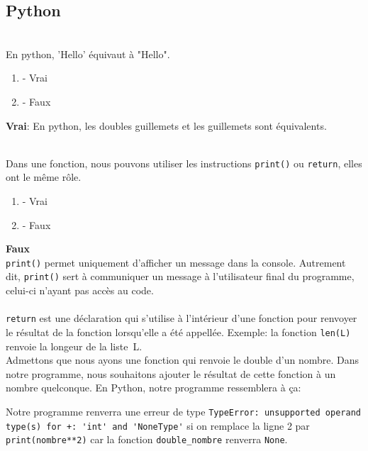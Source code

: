 \subsection{Python}

\begin{Exercice}[2 minutes]\\
En python, 'Hello' équivaut à "Hello". 

\begin{enumerate}[label=\Alph*]
    \item - Vrai
    \item - Faux
\end{enumerate}
\begin{solution}
    \textbf{Vrai}: En python, les doubles guillemets et les guillemets sont équivalents. 
\end{solution}
\end{Exercice}


\begin{Exercice}[2 minutes]\\
Dans une fonction, nous pouvons utiliser les instructions \lstinline{print()} ou \lstinline{return}, elles ont le même rôle.
\begin{enumerate}[label=\Alph*]
    \item - Vrai
    \item - Faux
\end{enumerate}
\begin{solution}
    \textbf{Faux}\\
    \lstinline{print()} permet uniquement d'afficher un message dans la console. Autrement dit, \lstinline{print()} sert à communiquer un message à l'utilisateur final du programme, celui-ci n'ayant pas accès au code.\\\\
    \lstinline{return} est une déclaration qui s'utilise à l'intérieur d'une fonction pour renvoyer le résultat de la fonction lorsqu'elle a été appellée. Exemple: la fonction \lstinline{len(L)} renvoie la longeur de la liste~L.\\

    Admettons que nous ayons une fonction qui renvoie le double d'un nombre. Dans notre programme, nous souhaitons ajouter le résultat de cette fonction à un nombre quelconque.
    En Python, notre programme ressemblera à ça:
    

    Notre programme renverra une erreur de type \lstinline{TypeError: unsupported operand type(s) for +: 'int' and 'NoneType'} si on remplace la ligne 2 par \lstinline{print(nombre**2)} car la fonction \lstinline{double_nombre} renverra \lstinline{None}.
\end{solution}
\end{Exercice}


